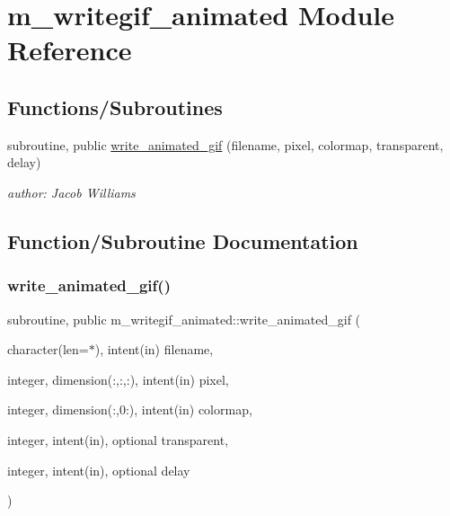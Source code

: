 \hypertarget{namespacem__writegif__animated}{}\section{m\+\_\+writegif\+\_\+animated Module Reference}
\label{namespacem__writegif__animated}
\subsection*{Functions/\+Subroutines}
\begin{DoxyCompactItemize}
\item 
subroutine, public \mbox{\hyperlink{namespacem__writegif__animated_a3da6a5c71a9d9e1f49aa075adc6629bd}{write\+\_\+animated\+\_\+gif}} (filename, pixel, colormap, transparent, delay)
\begin{DoxyCompactList}\small\item\em author\+: Jacob Williams \end{DoxyCompactList}\end{DoxyCompactItemize}


\subsection{Function/\+Subroutine Documentation}
\mbox{\label{namespacem__writegif__animated_a3da6a5c71a9d9e1f49aa075adc6629bd}} 
\subsubsection{\texorpdfstring{write\+\_\+animated\+\_\+gif()}{write\_animated\_gif()}}
{\footnotesize\ttfamily subroutine, public m\+\_\+writegif\+\_\+animated\+::write\+\_\+animated\+\_\+gif (\begin{DoxyParamCaption}\item[{character(len=$\ast$), intent(in)}]{filename,  }\item[{integer, dimension(\+:,\+:,\+:), intent(in)}]{pixel,  }\item[{integer, dimension(\+:,0\+:), intent(in)}]{colormap,  }\item[{integer, intent(in), optional}]{transparent,  }\item[{integer, intent(in), optional}]{delay }\end{DoxyParamCaption})}



